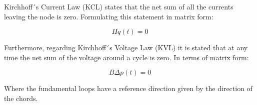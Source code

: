 Kirchhoff´s Current Law (KCL) states that the net sum of all the currents 
leaving the node is zero. Formulating this statement in matrix form:

\begin{equation}
  Hq(t) = 0
\end{equation}

Furthermore, regarding Kirchhoff´s Voltage Law (KVL) it is stated that at any time the net sum of the voltage around a cycle 
is zero. In terms of matrix form:

\begin{equation}
  B\Delta p (t) = 0
\end{equation}

Where the fundamental loops have a reference direction given by the direction of the 
chords. 





 